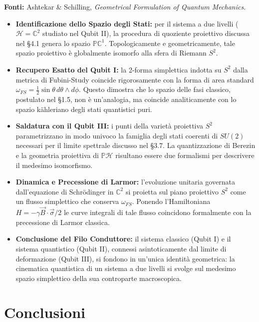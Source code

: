 \documentclass[12pt, a4paper]{article}
\newcommand{\fonti}[1]{%
	\begin{fontebox}
		\textcolor{fontecolor}{\footnotesize\textbf{Fonti:} #1}
	\end{fontebox}%
}
\begin{document}
	\fonti{Ashtekar \& Schilling, \textit{Geometrical Formulation of Quantum Mechanics}.}
	
	\begin{itemize}
		\item \textbf{Identificazione dello Spazio degli Stati:} per il sistema a due livelli ($\mathcal{H} = \mathbb{C}^{2}$ studiato nel Qubit II), la procedura di quoziente proiettivo discussa nel §4.1 genera lo spazio $\mathbb{P}\mathbb{C}^{1}$. Topologicamente e geometricamente, tale spazio proiettivo è globalmente isomorfo alla sfera di Riemann $S^{2}$.
		\item \textbf{Recupero Esatto del Qubit I:} la 2-forma simplettica indotta su $S^{2}$ dalla metrica di Fubini-Study coincide rigorosamente con la forma di area standard $\omega_{FS} = \frac{1}{2}\sin\theta \, d\theta \wedge d\phi$. Questo dimostra che lo spazio delle fasi classico, postulato nel §1.5, non è un'analogia, ma coincide analiticamente con lo spazio kähleriano degli stati quantistici puri.
		\item \textbf{Saldatura con il Qubit III:} i punti della varietà proiettiva $S^{2}$ parametrizzano in modo univoco la famiglia degli stati coerenti di $SU(2)$ necessari per il limite spettrale discusso nel §3.7. La quantizzazione di Berezin e la geometria proiettiva di $\mathbb{P}\mathcal{H}$ risultano essere due formalismi per descrivere il medesimo isomorfismo.
		\item \textbf{Dinamica e Precessione di Larmor:} l'evoluzione unitaria governata dall'equazione di Schrödinger in $\mathbb{C}^{2}$ si proietta sul piano proiettivo $S^{2}$ come un flusso simplettico che conserva $\omega_{FS}$. Ponendo l'Hamiltoniana $H = -\gamma \vec{B} \cdot \vec{\sigma}/2$ le curve integrali di tale flusso coincidono formalmente con la precessione di Larmor classica.
		\item \textbf{Conclusione del Filo Conduttore:} il sistema classico (Qubit I) e il sistema quantistico (Qubit II), connessi asintoticamente dal limite di deformazione (Qubit III), si fondono in un'unica identità geometrica: la cinematica quantistica di un sistema a due livelli si svolge sul medesimo spazio simplettico della sua controparte macroscopica.
	\end{itemize}
	
	\newpage
	\section*{Conclusioni}
	
\end{document}
